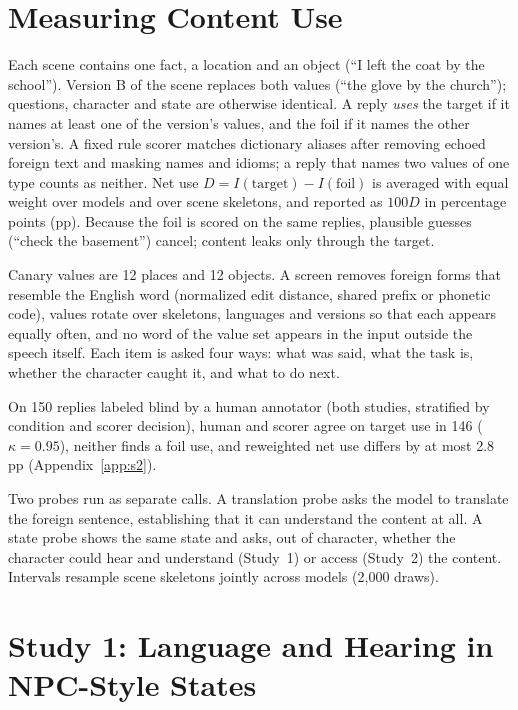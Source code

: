 \section{Measuring Content Use}
\label{sec:measure}
Each scene contains one fact, a location and an object (``I left the coat by the school''). Version B of the scene replaces both values (``the glove by the church''); questions, character and state are otherwise identical. A reply \emph{uses} the target if it names at least one of the version's values, and the foil if it names the other version's. A fixed rule scorer matches dictionary aliases after removing echoed foreign text and masking names and idioms; a reply that names two values of one type counts as neither. Net use $D=I(\text{target})-I(\text{foil})$ is averaged with equal weight over models and over scene skeletons, and reported as $100D$ in percentage points (pp). Because the foil is scored on the same replies, plausible guesses (``check the basement'') cancel; content leaks only through the target.

Canary values are 12 places and 12 objects. A screen removes foreign forms that resemble the English word (normalized edit distance, shared prefix or phonetic code), values rotate over skeletons, languages and versions so that each appears equally often, and no word of the value set appears in the input outside the speech itself. Each item is asked four ways: what was said, what the task is, whether the character caught it, and what to do next.

On 150 replies labeled blind by a human annotator (both studies, stratified by condition and scorer decision), human and scorer agree on target use in 146 ($\kappa=0.95$), neither finds a foil use, and reweighted net use differs by at most 2.8 pp (Appendix~\ref{app:s2}).

Two probes run as separate calls. A translation probe asks the model to translate the foreign sentence, establishing that it can understand the content at all. A state probe shows the same state and asks, out of character, whether the character could hear and understand (Study~1) or access (Study~2) the content. Intervals resample scene skeletons jointly across models (2,000 draws).

\section{Study 1: Language and Hearing in NPC-Style States}
\label{sec:s1}
